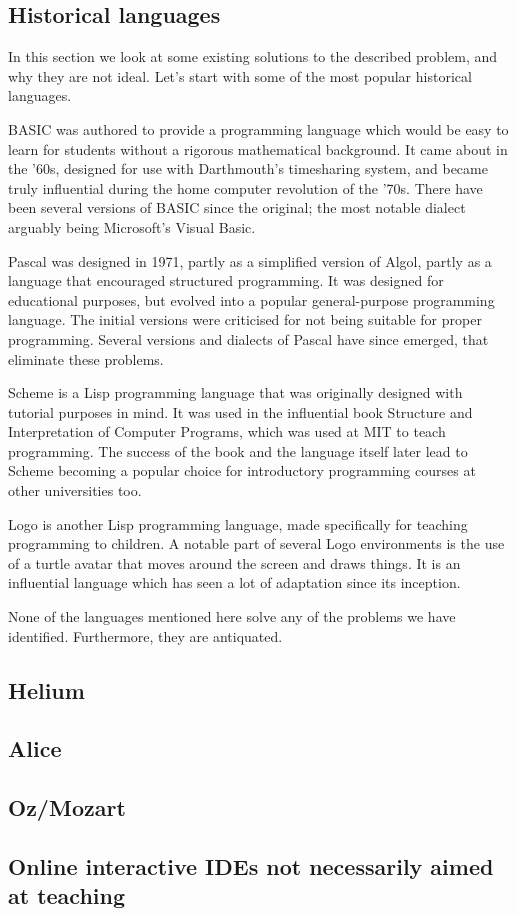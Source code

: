 \subsection{Historical languages}
In this section we look at some existing solutions to the described problem, 
and why they are not ideal. Let's start with some of the most popular 
historical languages.

BASIC was authored to provide a programming language which would be easy to 
learn for students without a rigorous mathematical background. It came about 
in the '60s, designed for use with Darthmouth's timesharing system, and became 
truly influential during the home computer revolution of the '70s. There have 
been several versions of BASIC since the original; the most notable dialect 
arguably being Microsoft's Visual Basic\cite{time2014basic}.

Pascal was designed in 1971, partly as a simplified version of Algol, partly 
as a language that encouraged structured programming. It was designed for 
educational purposes, but evolved into a popular general-purpose programming 
language\cite{cantu2008essential}. The initial versions were criticised for 
not being suitable for proper programming\cite{kernighan1981pascal}. Several 
versions and dialects of Pascal have since emerged\cite{cantu2008essential}, 
that eliminate these problems.

Scheme is a Lisp programming language that was originally designed with 
tutorial purposes in mind\cite{sussman1998scheme}. It was used in the 
influential book Structure and Interpretation of Computer Programs, which was 
used at MIT to teach programming. The success of the book and the language 
itself later lead to Scheme becoming a popular choice for introductory 
programming courses at other universities too\cite{felleisen2004structure}.

Logo is another Lisp programming language, made specifically for teaching 
programming to children. A notable part of several Logo environments is the 
use of a turtle avatar that moves around the screen and draws things. It is an 
influential language which has seen a lot of adaptation since its 
inception\cite{logo2011whatislogo}.

None of the languages mentioned here solve any of the problems we have 
identified. Furthermore, they are antiquated.

\subsection{Helium}

\subsection{Alice}

\subsection{Oz/Mozart}

\subsection{Online interactive IDEs not necessarily aimed at teaching}
